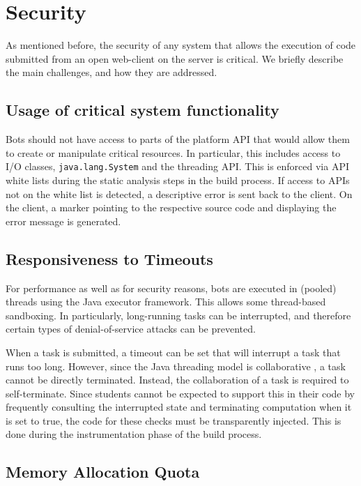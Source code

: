 \section{Security}


As mentioned before, the security of any system that allows the execution of code submitted from an open web-client on the server is critical. We briefly describe the main challenges, and how they are addressed. 

\subsection{Usage of critical system functionality}
\label{ssec:whitelist}

Bots should not have access to parts of the platform API that would allow them to create or manipulate critical resources. In particular, this includes access to I/O classes, \texttt{java.lang.System} and the threading API. This is enforced via API white lists during the static analysis steps in the build process. If access to APIs not on the white list is detected, a descriptive error is sent back to the client. On the client, a marker pointing to the respective source code and displaying the error message is generated.  


\subsection{Responsiveness to Timeouts}
\label{ssec:timeouts}

For performance as well as for security reasons, bots are executed in (pooled) threads using the Java executor framework. This allows some thread-based sandboxing. In particularly, long-running tasks can be interrupted, and therefore certain types of denial-of-service attacks can be prevented.

When a task is submitted, a timeout can be set that will interrupt a task that runs too long. However, since the Java threading model is collaborative \cite{goetz2006java}, a task cannot be directly terminated. Instead, the collaboration of a task is required to self-terminate. Since students cannot be expected to support this in their code by frequently consulting the interrupted state and terminating computation when it is set to true, the code for these checks must be transparently injected. This is done during the instrumentation phase of the build process.  

\subsection{Memory Allocation Quota}

